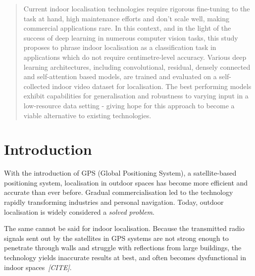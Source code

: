 \documentclass[a4paper]{article}
\begin{document}

\newpage

\tableofcontents
\newpage

\begin{abstract} %

Current indoor localisation technologies require rigorous fine-tuning to the
task at hand, high maintenance efforts and don’t scale well, making
commercial applications rare. In this context, and in the light of the
success of deep learning in numerous computer vision tasks, this study
proposes to phrase indoor localisation as a classification task in
applications which do not require centimetre-level accuracy. Various deep
learning architectures, including convolutional, residual, densely connected
and self-attention based models, are trained and evaluated on a
self-collected indoor video dataset for localisation. The best performing
models exhibit capabilities for generalisation and robustness to varying
input in a low-resource data setting - giving hope for this approach to
become a viable alternative to existing technologies.

\end{abstract}

\section{Introduction}
\label{sec:introduction}

With the introduction of GPS (Global Positioning System), a satellite-based
positioning system, localisation in outdoor spaces has become more efficient
and accurate than ever before. Gradual commercialisation led to the technology
rapidly transforming industries and personal navigation. Today, outdoor
localisation is widely considered a \textit{solved problem}.

The same cannot be said for indoor localisation. Because the transmitted radio
signals sent out by the satellites in GPS systems are not strong enough to
penetrate through walls and struggle with reflections from large buildings,
the technology yields inaccurate results at best, and often becomes
dysfunctional in indoor spaces~\textit{[CITE]}.
\end{document}
